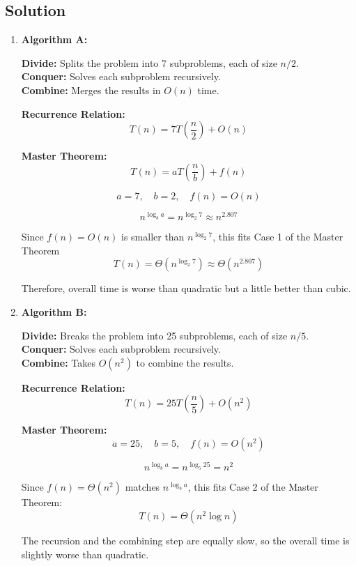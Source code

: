 \documentclass[12pt]{article}
\begin{document}
\subsection*{Solution}
\begin{enumerate}[label=(\alph*)]
    \item \textbf{Algorithm A:}
    
    \textbf{Divide:} Splits the problem into 7 subproblems, each of size \(n/2\).\\
    \textbf{Conquer:} Solves each subproblem recursively.\\
    \textbf{Combine:} Merges the results in \(O(n)\) time.
    
    \textbf{Recurrence Relation:}
    \[
    T(n) = 7T\left(\frac{n}{2}\right) + O(n)
    \]
    
    \textbf{Master Theorem:}
    \[
    T(n) = aT\left(\frac{n}{b}\right) + f(n)
    \]

    \[
    a = 7,\quad b = 2,\quad f(n) = O(n)
    \]
    
    \[
    n^{\log_b a} = n^{\log_2 7} \approx n^{2.807}
    \]
    
    Since \(f(n) = O(n)\) is smaller than \(n^{\log_2 7}\), this fits Case 1 of the Master Theorem
    \[
    \boxed{T(n) = \Theta(n^{\log_2 7}) \approx \Theta(n^{2.807})}
    \]
    
    Therefore, overall time is worse than quadratic but a little better than cubic.
    
    \item \textbf{Algorithm B:}
    
    \textbf{Divide:} Breaks the problem into 25 subproblems, each of size \(n/5\).\\
    \textbf{Conquer:} Solves each subproblem recursively.\\
    \textbf{Combine:} Takes \(O(n^2)\) to combine the results.
    
    \textbf{Recurrence Relation:}
    \[
    T(n) = 25T\left(\frac{n}{5}\right) + O(n^2)
    \]
    
    \textbf{Master Theorem:}
    \[
    a = 25,\quad b = 5,\quad f(n) = O(n^2)
    \]
    
    \[
    n^{\log_b a} = n^{\log_5 25} = n^2
    \]
    
    Since \(f(n) = \Theta(n^2)\) matches \(n^{\log_b a}\), this fits Case 2 of the Master Theorem:
    \[
    \boxed{T(n) = \Theta(n^2 \log n)}
    \]
    
    The recursion and the combining step are equally slow, so the overall time is slightly worse than quadratic.
    

\end{enumerate}
\end{document}
